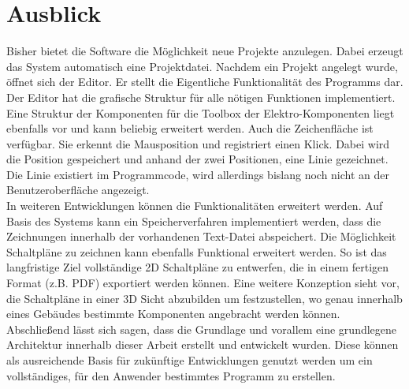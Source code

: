 \section{Ausblick}
Bisher bietet die Software die Möglichkeit neue Projekte anzulegen. Dabei erzeugt das System automatisch eine Projektdatei. Nachdem ein Projekt angelegt wurde, öffnet sich der Editor. Er stellt die Eigentliche Funktionalität des Programms dar. Der Editor hat die grafische Struktur für alle nötigen Funktionen implementiert. Eine Struktur der Komponenten für die Toolbox der Elektro-Komponenten liegt ebenfalls vor und kann beliebig erweitert werden. Auch die Zeichenfläche ist verfügbar. Sie erkennt die Mausposition und registriert einen Klick. Dabei wird die Position gespeichert und anhand der zwei Positionen, eine Linie gezeichnet. Die Linie existiert im Programmcode, wird allerdings bislang noch nicht an der Benutzeroberfläche angezeigt.
\\ 
In weiteren Entwicklungen können die Funktionalitäten erweitert werden. Auf Basis des Systems kann ein Speicherverfahren implementiert werden, dass die Zeichnungen innerhalb der vorhandenen Text-Datei abspeichert. Die Möglichkeit Schaltpläne zu zeichnen kann ebenfalls Funktional erweitert werden. So ist das langfristige Ziel vollständige 2D Schaltpläne zu entwerfen, die in einem fertigen Format (z.B. PDF) exportiert werden können. Eine weitere Konzeption sieht vor, die Schaltpläne in einer 3D Sicht abzubilden um festzustellen, wo genau innerhalb eines Gebäudes bestimmte Komponenten angebracht werden können. Abschließend lässt sich sagen, dass die Grundlage und vorallem eine grundlegene Architektur innerhalb dieser Arbeit erstellt und entwickelt wurden. Diese können als ausreichende Basis für zukünftige Entwicklungen genutzt werden um ein vollständiges, für den Anwender bestimmtes Programm zu erstellen.
